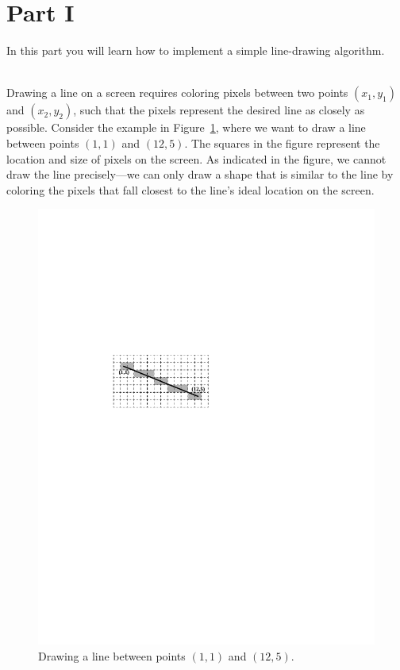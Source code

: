 \documentclass[epsfig,10pt,fullpage]{article}
\begin{document}
\section*{Part I}
In this part you will learn how to implement a simple line-drawing algorithm.

~\\
Drawing a line on a screen requires coloring pixels between two points $(x_1,y_1)$ and 
$(x_2,y_2)$, such that the pixels represent the desired line as closely as possible. Consider 
the example in Figure~\ref{fig:line_drawing}, where we want to draw a line between 
points $(1,1)$ and $(12,5)$. The squares in the figure represent the location and size of pixels
on the screen. As indicated in the figure, we cannot draw the line precisely---we can
only draw a shape that is similar to the line by coloring the pixels that fall closest to 
the line's ideal location on the screen.

\begin{figure}[h!]
   \begin{center}
       \includegraphics{figures/fig_line_drawing}
   \end{center}
   \caption{Drawing a line between points $(1,1)$ and $(12,5)$.}
	\label{fig:line_drawing}
\end{figure}
\end{document}
